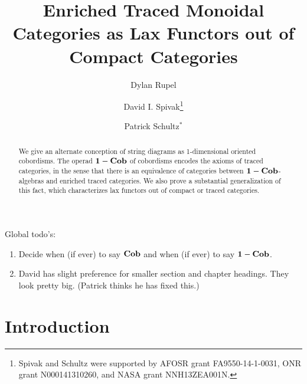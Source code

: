 \documentclass[12pt,oneside,article,draft]{memoir}
\title{Enriched Traced Monoidal Categories as Lax Functors out of Compact Categories}
\author{
Dylan Rupel 
 \and 
David I. Spivak\thanks{Spivak and Schultz were supported by AFOSR grant FA9550-14-1-0031, ONR grant N000141310260, and NASA grant NNH13ZEA001N.}
 \and 
 Patrick Schultz${}^*$%
 }
\begin{document}
\tightlists
\firmlists

\maketitle
\begin{abstract}
We give an alternate conception of string diagrams as 1-dimensional oriented cobordisms. The operad $\mathbf{1-Cob}$ of cobordisms encodes the axioms of traced categories, in the sense that there is an equivalence of categories between $\mathbf{1-Cob}$-algebras and enriched traced categories. We also prove a substantial generalization of this fact, which characterizes lax functors out of compact or traced categories.
\end{abstract}
Global todo's:
\begin{enumerate}
\item Decide when (if ever) to say $\mathbf{Cob}$ and when (if ever) to say $\mathbf{1-Cob}$.
\item David has slight preference for smaller section and chapter headings. They look pretty big. (Patrick thinks he has fixed this.)
\end{enumerate}
\tableofcontents*


\chapter{Introduction}
\end{document}
